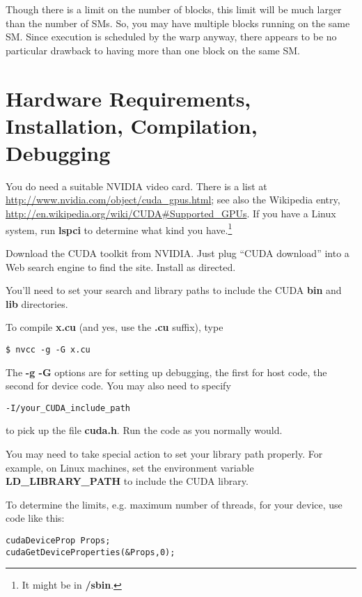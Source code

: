 Though there is a limit on the number of blocks, this limit will be much
larger than the number of SMs.  So, you may have multiple blocks running
on the same SM.  Since execution is scheduled by the warp anyway, there
appears to be no particular drawback to having more than one block on
the same SM.

\section{Hardware Requirements, Installation, Compilation, Debugging}

You do need a suitable NVIDIA video card.  There is a list at
\url{http://www.nvidia.com/object/cuda_gpus.html}; see also the
Wikipedia entry, \url{http://en.wikipedia.org/wiki/CUDA#Supported_GPUs}.
If you have a Linux system, run {\bf lspci} to determine what kind you
have.\footnote{It might be in {\bf /sbin}.}

Download the CUDA toolkit from NVIDIA.  Just plug ``CUDA download'' into
a Web search engine to find the site.  Install as directed.

You'll need to set your search and library paths to include the CUDA {\bf
bin} and {\bf lib} directories.

To compile {\bf x.cu} (and yes, use the {\bf .cu} suffix), type

\begin{Verbatim}[fontsize=\relsize{-2}]
$ nvcc -g -G x.cu 
\end{Verbatim}

The {\bf -g -G} options are for setting up debugging, the first for host
code, the second for device code.  You may also need to specify

\begin{Verbatim}[fontsize=\relsize{-2}]
-I/your_CUDA_include_path
\end{Verbatim}

to pick up the file {\bf cuda.h}.  Run the code as you normally would.

You may need to take special action to set your library path properly.
For example, on Linux machines, set the environment variable {\bf
LD\_LIBRARY\_PATH} to include the CUDA library.

To determine the limits, e.g. maximum number of threads, for your
device, use code like this:

\begin{Verbatim}[fontsize=\relsize{-2}]
cudaDeviceProp Props;
cudaGetDeviceProperties(&Props,0);
\end{Verbatim}

